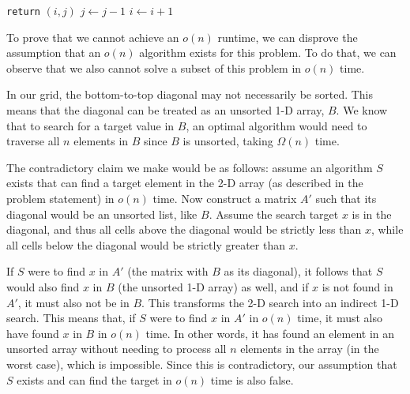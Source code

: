 \documentclass[12pt]{article}
\begin{document}
\begin{enumerate}
\begin{algorithm}
\begin{algorithmic}
                    \State \texttt{return} $(i, j)$
                \Else
                        \State $j \gets j - 1$
                    \Else
                        \State $i \gets i + 1$
                    \EndIf
                \EndIf
            \EndWhile
        \end{algorithmic}
    \end{algorithm}

    To prove that we cannot achieve an $o(n)$ runtime, we can disprove the assumption that an $o(n)$ algorithm exists for 
    this problem. To do that, we can observe that we also cannot solve a subset of this problem in $o(n)$ time. 

    In our grid, the bottom-to-top diagonal may not necessarily be sorted. This means that the diagonal 
    can be treated as an unsorted 1-D array, $B$. We know that to search for a target value in $B$, an optimal algorithm 
    would need to traverse all $n$ elements in $B$ since $B$ is unsorted, taking $\Omega(n)$ time.

    The contradictory claim we make would be as follows: assume an algorithm $S$ exists that can find a target element in the 
    2-D array (as described in the problem statement) in $o(n)$ time. Now construct a matrix $A'$ such that its diagonal would 
    be an unsorted list, like $B$. Assume the search target $x$ is in the diagonal, and thus all cells above the diagonal 
    would be strictly less than $x$, while all cells below the diagonal would be strictly greater than $x$.

    If $S$ were to find $x$ in $A'$ (the matrix with $B$ as its diagonal), it follows that $S$ would also find $x$ in $B$ 
    (the unsorted 1-D array) as well, and if $x$ is not found in $A'$, it must also not be in $B$. This transforms the 2-D 
    search into an indirect 1-D search. This means that, if $S$ were to find $x$ in $A'$ in $o(n)$ time, it must also have found 
    $x$ in $B$ in $o(n)$ time. In other words, it has found an element in an unsorted array without needing to process all $n$ elements 
    in the array (in the worst case), which is impossible. Since this is contradictory, our assumption that $S$ exists and can find the target in 
    $o(n)$ time is also false.
    

\end{enumerate}
\end{document}
